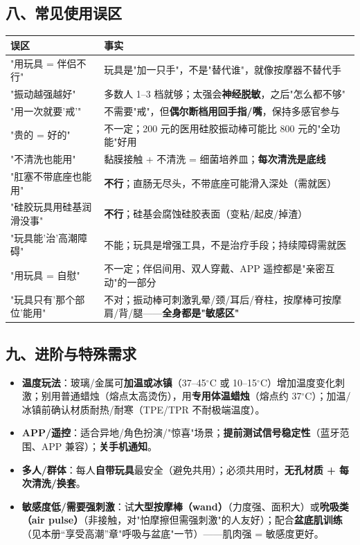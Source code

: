 \documentclass[12pt,UTF8,openany]{ctexbook}
\begin{document}
\subsection*{八、常见使用误区}
\begin{tabularx}{\textwidth}{X X}
\toprule
\textbf{误区} & \textbf{事实} \\
\midrule
"用玩具 = 伴侣不行" & 玩具是"加一只手"，不是"替代谁"，就像按摩器不替代手 \\
"振动越强越好" & 多数人 1--3 档就够；太强会\textbf{神经脱敏}，之后"怎么都不够" \\
"用一次就要'戒'" & 不需要"戒"，但\textbf{偶尔断档用回手指/嘴}，保持多感官参与 \\
"贵的 = 好的" & 不一定；200 元的医用硅胶振动棒可能比 800 元的"全功能"好用 \\
"不清洗也能用" & 黏膜接触 + 不清洗 = 细菌培养皿；\textbf{每次清洗是底线} \\
"肛塞不带底座也能用" & \textbf{不行}；直肠无尽头，不带底座可能滑入深处（需就医） \\
"硅胶玩具用硅基润滑没事" & \textbf{不行}；硅基会腐蚀硅胶表面（变粘/起皮/掉渣） \\
"玩具能'治'高潮障碍" & 不能；玩具是增强工具，不是治疗手段；持续障碍需就医 \\
"用玩具 = 自慰" & 不一定；伴侣间用、双人穿戴、APP 遥控都是"亲密互动"的一部分 \\
"玩具只有'那个部位'能用" & 不对；振动棒可刺激乳晕/颈/耳后/脊柱，按摩棒可按摩肩/背/腿——\textbf{全身都是"敏感区"} \\
\bottomrule
\end{tabularx}

\subsection*{九、进阶与特殊需求}
\begin{itemize}[leftmargin=2em,itemsep=0.4em]
  \item \textbf{温度玩法}：玻璃/金属可\textbf{加温或冰镇}（37--45$^\circ$C 或 10--15$^\circ$C）增加温度变化刺激；别用普通蜡烛（熔点太高烫伤），用\textbf{专用体温蜡烛}（熔点约 37$^\circ$C）；加温/冰镇前确认材质耐热/耐寒（TPE/TPR 不耐极端温度）。
  \item \textbf{APP/遥控}：适合异地/角色扮演/"惊喜"场景；\textbf{提前测试信号稳定性}（蓝牙范围、APP 兼容）；\textbf{关手机通知}。
  \item \textbf{多人/群体}：每人\textbf{自带玩具}最安全（避免共用）；必须共用时，\textbf{无孔材质 + 每次清洗/换套}。
  \item \textbf{敏感度低/需要强刺激}：试\textbf{大型按摩棒（wand）}（力度强、面积大）或\textbf{吮吸类（air pulse）}（非接触，对"怕摩擦但需强刺激"的人友好）；配合\textbf{盆底肌训练}（见本册“享受高潮”章"呼吸与盆底"一节）——肌肉强 = 敏感度更好。
\end{itemize}
\end{document}
